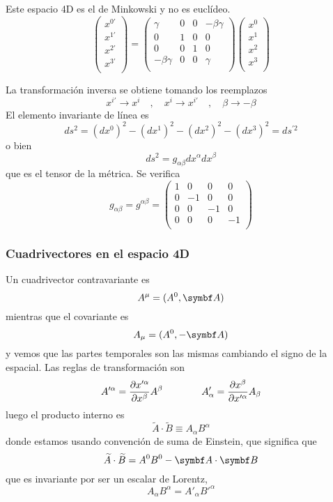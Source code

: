 \documentclass[10pt,oneside]{CBFT_book}
\begin{document}
	
Este espacio 4D es el de Minkowski y no es euclídeo.
\[
	\begin{pmatrix}
	 x^{0'} \\
	 x^{1'} \\
	 x^{2'} \\
	 x^{3'} \\
	\end{pmatrix}
	=
	\begin{pmatrix}
	\gamma & 0 & 0 & -\beta\gamma \\
	0 & 1 & 0 & 0 \\
	0 & 0 & 1 & 0\\
	-\beta\gamma  & 0 & 0 & \gamma \\
	\end{pmatrix}
	\begin{pmatrix}
	 x^{0} \\
	 x^{1} \\
	 x^{2} \\
	 x^{3} \\
	\end{pmatrix}
\]

La transformación inversa se obtiene tomando los reemplazos
\[
	x^{i'} \to x^i \quad ,\quad  x^i \to x^{i'} \quad ,\quad  \beta \to -\beta
\]
El elemento invariante de línea es 
\[
	ds^2 = (dx^0)^2 - (dx^1)^2 - (dx^2)^2 - (dx^3)^2 = ds^{'2}
\]
o bien 
\[
	ds^2 = g_{\alpha\beta}dx^{\alpha}dx^{\beta}
\]
que es el tensor de la métrica. Se verifica
\[
	g_{\alpha\beta} = g^{\alpha\beta} =
	\begin{pmatrix}
	 1 & 0 & 0 & 0 \\
	 0 & -1 & 0 & 0 \\
	 0 & 0 & -1 & 0 \\
	 0 & 0 & 0 & -1 \\
	\end{pmatrix}
\]

\subsubsection{Cuadrivectores en el espacio 4D}

Un cuadrivector contravariante es
\[
	A^{\mu} = ( A^0, \vb{A})
\]
mientras que el covariante es
\[
	A_{\mu} = ( A^0, -\vb{A})
\]
y vemos que las partes temporales son las mismas cambiando el signo de la espacial. Las reglas de 
transformación son
\[
	A'^{\alpha}= \frac{\partial^{\hspace{-0.05em}} {x'^{\alpha}}}{\partial {x^{\beta}}^{\hspace{-0.05em}}} A^{\beta} \qquad\qquad 
		A'_{\alpha}= \frac{\partial^{\hspace{-0.05em}} {x^{\beta}}}{\partial {x'^{\alpha}}^{\hspace{-0.05em}}} A_{\beta}
\]
luego el producto interno es
\[
	\widetilde{A}\cdot\widetilde{B} \equiv A_\alpha B^\alpha
\]
donde estamos usando convención de suma de Einstein, que significa que 
\[
	\widetilde{A}\cdot\widetilde{B} = A^0 B^0 -\pe{A}{B}
\]
que es invariante por ser un escalar de Lorentz,
\[
	A_\alpha B^\alpha = A'_\alpha B'^\alpha
\]
\end{document}
